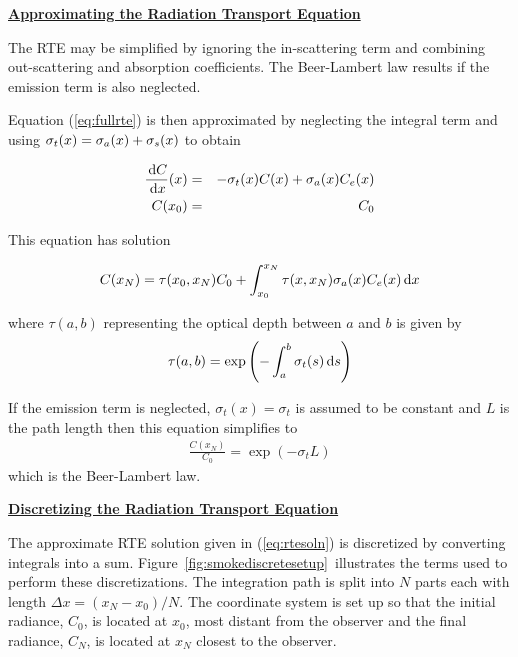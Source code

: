 \documentclass[11pt]{article}
\newcommand{\ssubsection}[1]{\underline{\bf #1}}
\begin{document}

\ssubsection{Approximating the Radiation Transport Equation}

The RTE may be simplified by ignoring the in-scattering term and combining out-scattering
and absorption coefficients.  The Beer-Lambert law results if the emission term is also
neglected.

Equation (\ref{eq:fullrte}) is then approximated by neglecting the
integral term and using $\sigma_t(x)=\sigma_a(x)+\sigma_s(x)$ to obtain

\begin{eqnarray}
\frac{\,\mbox{d}C}{\,\mbox{d}x}(x)&=&-\sigma_t(x) C(x) + \sigma_a(x) C_e(x)\\
 C(x_0)&=&C_0
\end{eqnarray}

\noindent This equation has solution

\begin{equation}
\label{eq:rtesoln}
 C(x_N)=\tau(x_0,x_N)C_0 + \int_{x_0}^{x_N}\tau(x,x_N)\sigma_a(x)C_e(x) \,\mbox{d}x
\end{equation}

\noindent where $\tau(a,b)$ representing the optical depth between $a$ and $b$ is given by
\begin{equation}
\label{eq:optdepth}
\tau(a,b)=\exp\left({-\int_{a}^{b} \sigma_t(s) \,\mbox{d}s}\right)
\end{equation}

\noindent If the emission term is neglected, $\sigma_t(x)=\sigma_t$ is assumed to be constant
and $L$ is the path length then this equation simplifies to
\begin{eqnarray}
 \frac{C(x_N)}{C_0}=\exp(-\sigma_tL)
\end{eqnarray}
which is the Beer-Lambert law.


\ssubsection{Discretizing the Radiation Transport Equation}

\newcommand{\htau}[1]{\tau_{#1}^{N-1}}
\newcommand{\halpha}[1]{\alpha_{#1}^{N-1}}
\newcommand{\sigai}[1]{\sigma_{a,#1}}
\newcommand{\Lei}[1]{C_{e,#1}}
\newcommand{\Lhatj}[1]{C_{#1}^N}
\newcommand{\Lhatjj}[1]{\hat{C}_{#1}^N}
\newcommand{\Chatjj}[1]{\hat{C}_{#1}^N}
\newcommand{\Leii}[1]{\hat{C}_{e,#1}}

The approximate RTE solution given in (\ref{eq:rtesoln}) is
discretized by converting integrals into a sum. Figure~\ref{fig:smokediscretesetup}\ illustrates the terms used to
perform these discretizations.  The integration path is split into $N$ parts
each with length $\Delta x=(x_N-x_0)/N$.  The coordinate system is
set up so that the initial radiance, $C_0$, is located at $x_0$,
most distant from the observer and the final radiance, $C_N$, is
located at $x_N$ closest to the observer.
\end{document}
